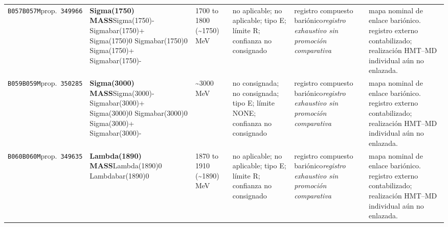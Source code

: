 \begin{landscape}
\begin{longtable}{L{1.85cm}L{4.45cm}L{2.35cm}L{4.05cm}L{3.35cm}L{7.15cm}}
\texttt{B057}\newline \texttt{B057M}\newline prop.\ \texttt{349966} & \textbf{Sigma(1750) MASS}\newline Sigma(1750)- \textbar{}\allowbreak{} Sigmabar(1750)+ \textbar{}\allowbreak{} Sigma(1750)0 \textbar{}\allowbreak{} Sigmabar(1750)0 \textbar{}\allowbreak{} Sigma(1750)+ \textbar{}\allowbreak{} Sigmabar(1750)- & 1700 to 1800 (\textasciitilde{}1750)\,MeV & no aplicable; no aplicable; tipo E; límite R; confianza no consignado & registro compuesto bariónico\newline \emph{registro exhaustivo sin promoción comparativa} & mapa nominal de enlace bariónico. registro externo contabilizado; realización HMT--MD individual aún no enlazada. \\
\texttt{B059}\newline \texttt{B059M}\newline prop.\ \texttt{350285} & \textbf{Sigma(3000) MASS}\newline Sigma(3000)- \textbar{}\allowbreak{} Sigmabar(3000)+ \textbar{}\allowbreak{} Sigma(3000)0 \textbar{}\allowbreak{} Sigmabar(3000)0 \textbar{}\allowbreak{} Sigma(3000)+ \textbar{}\allowbreak{} Sigmabar(3000)- & \textasciitilde{}3000\,MeV & no consignada; no consignada; tipo E; límite NONE; confianza no consignado & registro compuesto bariónico\newline \emph{registro exhaustivo sin promoción comparativa} & mapa nominal de enlace bariónico. registro externo contabilizado; realización HMT--MD individual aún no enlazada. \\
\texttt{B060}\newline \texttt{B060M}\newline prop.\ \texttt{349635} & \textbf{Lambda(1890) MASS}\newline Lambda(1890)0 \textbar{}\allowbreak{} Lambdabar(1890)0 & 1870 to 1910 (\textasciitilde{}1890)\,MeV & no aplicable; no aplicable; tipo E; límite R; confianza no consignado & registro compuesto bariónico\newline \emph{registro exhaustivo sin promoción comparativa} & mapa nominal de enlace bariónico. registro externo contabilizado; realización HMT--MD individual aún no enlazada. \\

\end{longtable}
\end{landscape}

